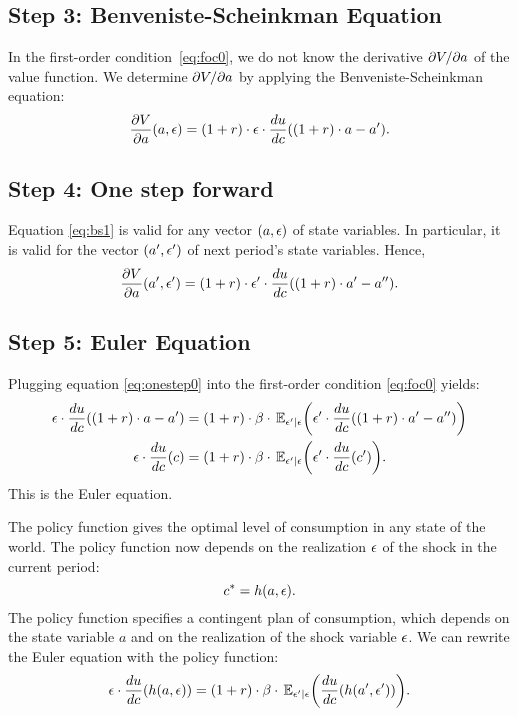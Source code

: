 \documentclass[letterpaper,12pt,leqno]{article}
\begin{document}
\subsection{Step 3: Benveniste-Scheinkman Equation}

In the first-order condition~\eqref{eq:foc0}, we do not know the derivative $\partial V/\partial a$ of the value function. We determine $\partial V/\partial a$ by applying the Benveniste-Scheinkman equation:
\begin{equation}
\frac{\partial V}{\partial a}(a,\epsilon)= (1+r)\cdot  \epsilon \cdot \frac{d u}{d c}((1+r)\cdot a-a').\label{eq:bs1}
\end{equation}
\subsection{Step 4: One step forward}
Equation \eqref{eq:bs1} is valid for any vector $(a,\epsilon)$ of state variables. In particular, it is valid for the vector $(a',\epsilon')$ of next period's state variables. Hence,
\begin{equation}
\frac{\partial V}{\partial a}(a',\epsilon')= (1+r)\cdot \epsilon'\cdot \frac{d u}{d c}((1+r)\cdot a'-a'').\label{eq:onestep0}
\end{equation}

\subsection{Step 5: Euler Equation}

Plugging equation \eqref{eq:onestep0} into the first-order condition \eqref{eq:foc0} yields:
\begin{align}
\e \cdot \od{u}{c}((1+r)\cdot a-a')&=(1+r)\cdot \b\cdot\E[\e'|\e]{\e' \cdot \od{u}{c}((1+r)\cdot a'-a'')}\nonumber\\
\e \cdot \od{u}{c}(c)&=(1+r)\cdot \b\cdot\E[\e'|\e]{\e' \cdot \od{u}{c}(c')}.\label{eq:eulerstoc}
\end{align}
This is the Euler equation.

The policy function gives the optimal level of consumption in any state of the world. The policy function now depends on the realization $\epsilon$ of the shock in the current period:
\[c^{*}=h(a,\epsilon).\]
The policy function specifies a contingent plan of consumption, which depends on the state variable $a$ and on the realization of the shock variable $\epsilon$. We can rewrite the Euler equation with the policy function:
\begin{equation*}
\e \cdot \od{u}{c}(h(a,\e))=(1+r)\cdot\b \cdot \E[\e'|\e]{ \od{u}{c}(h(a',\e'))}.
\end{equation*}
\end{document}
